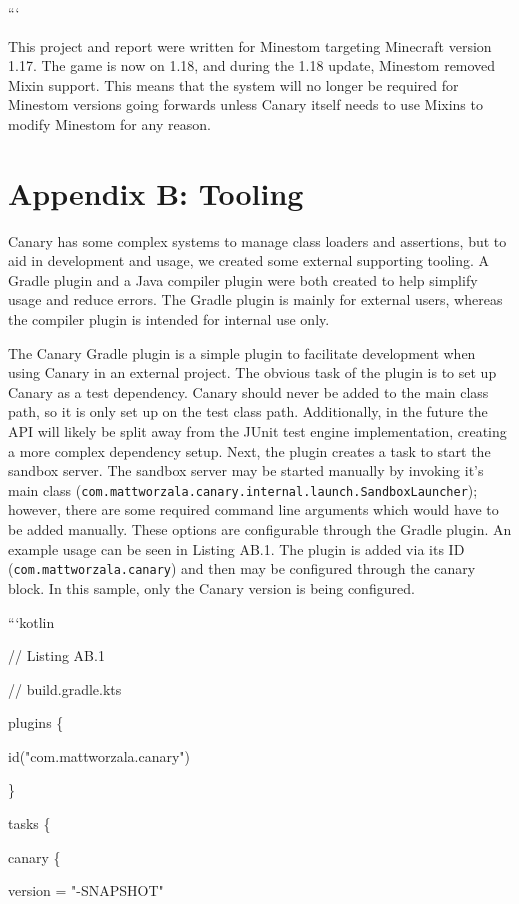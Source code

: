 \documentclass{article}
\def\code#1{\texttt{#1}}
\begin{document}
\begin{onehalfspacing}
```

This project and report were written for Minestom targeting Minecraft
version 1.17. The game is now on 1.18, and during the 1.18 update,
Minestom removed Mixin support. This means that the system will no
longer be required for Minestom versions going forwards unless Canary
itself needs to use Mixins to modify Minestom for any reason.

\section{Appendix B: Tooling}

Canary has some complex systems to manage class loaders and assertions,
but to aid in development and usage, we created some external supporting
tooling. A Gradle plugin and a Java compiler plugin were both created to
help simplify usage and reduce errors. The Gradle plugin is mainly for
external users, whereas the compiler plugin is intended for internal use
only.

The Canary Gradle plugin is a simple plugin to facilitate development
when using Canary in an external project. The obvious task of the plugin
is to set up Canary as a test dependency. Canary should never be added
to the main class path, so it is only set up on the test class path.
Additionally, in the future the API will likely be split away from the
JUnit test engine implementation, creating a more complex dependency
setup. Next, the plugin creates a task to start the sandbox server. The
sandbox server may be started manually by invoking it's main class
(\code{com.mattworzala.canary.internal.launch.SandboxLauncher}); however, there
are some required command line arguments which would have to be added
manually. These options are configurable through the Gradle plugin. An
example usage can be seen in Listing AB.1. The plugin is added via its
ID (\code{com.mattworzala.canary}) and then may be configured through the
canary block. In this sample, only the Canary version is being
configured.

```kotlin

// Listing AB.1

// build.gradle.kts

plugins \{

id("com.mattworzala.canary")

\}

tasks \{

canary \{

version = "-SNAPSHOT"


\end{onehalfspacing}
\end{document}
